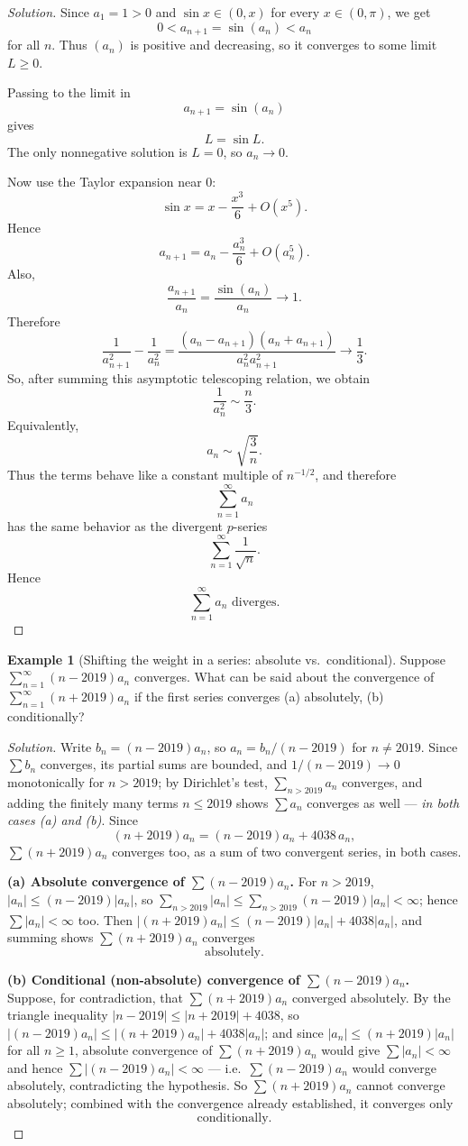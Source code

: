 \documentclass[11pt]{article}
\theoremstyle{definition}
\newtheorem{example}{Example}[section]
\begin{document}
\begin{proof}[Solution]
Since $a_1=1>0$ and $\sin x\in (0,x)$ for every $x\in(0,\pi)$, we get
\[
0<a_{n+1}=\sin(a_n)<a_n
\]
for all $n$. Thus $(a_n)$ is positive and decreasing, so it converges to some limit $L\ge 0$.

Passing to the limit in
\[
a_{n+1}=\sin(a_n)
\]
gives
\[
L=\sin L.
\]
The only nonnegative solution is $L=0$, so $a_n\to 0$.

Now use the Taylor expansion near $0$:
\[
\sin x = x-\frac{x^3}{6}+O(x^5).
\]
Hence
\[
a_{n+1}=a_n-\frac{a_n^3}{6}+O(a_n^5).
\]
Also,
\[
\frac{a_{n+1}}{a_n}=\frac{\sin(a_n)}{a_n}\to 1.
\]
Therefore
\[
\frac{1}{a_{n+1}^2}-\frac{1}{a_n^2}
=\frac{(a_n-a_{n+1})(a_n+a_{n+1})}{a_n^2 a_{n+1}^2}
\to \frac13.
\]
So, after summing this asymptotic telescoping relation, we obtain
\[
\frac{1}{a_n^2}\sim \frac{n}{3}.
\]
Equivalently,
\[
a_n\sim \sqrt{\frac{3}{n}}.
\]
Thus the terms behave like a constant multiple of $n^{-1/2}$, and therefore
\[
\sum_{n=1}^{\infty} a_n
\]
has the same behavior as the divergent $p$-series
\[
\sum_{n=1}^{\infty} \frac{1}{\sqrt{n}}.
\]
Hence
\[
\boxed{\sum_{n=1}^{\infty} a_n \text{ diverges}.}
\]
\end{proof}

\begin{example}[Shifting the weight in a series: absolute vs.\ conditional]
Suppose $\sum_{n=1}^\infty (n-2019)a_n$ converges. What can be said about the convergence of $\sum_{n=1}^\infty(n+2019)a_n$ if the first series converges (a) absolutely, (b) conditionally?
\end{example}

\begin{proof}[Solution]
Write $b_n=(n-2019)a_n$, so $a_n=b_n/(n-2019)$ for $n\neq2019$. Since $\sum b_n$ converges, its partial sums are bounded, and $1/(n-2019)\to0$ monotonically for $n>2019$; by Dirichlet's test, $\sum_{n>2019}a_n$ converges, and adding the finitely many terms $n\le2019$ shows $\sum a_n$ converges as well — \emph{in both cases (a) and (b)}. Since
\[
(n+2019)a_n = (n-2019)a_n + 4038\,a_n,
\]
$\sum(n+2019)a_n$ converges too, as a sum of two convergent series, in both cases.

\textbf{(a) Absolute convergence of $\sum(n-2019)a_n$.} For $n>2019$, $|a_n|\le(n-2019)|a_n|$, so $\sum_{n>2019}|a_n|\le\sum_{n>2019}(n-2019)|a_n|<\infty$; hence $\sum|a_n|<\infty$ too. Then $|(n+2019)a_n|\le(n-2019)|a_n|+4038|a_n|$, and summing shows $\sum(n+2019)a_n$ converges
\[
\boxed{\text{absolutely}}.
\]

\textbf{(b) Conditional (non-absolute) convergence of $\sum(n-2019)a_n$.} Suppose, for contradiction, that $\sum(n+2019)a_n$ converged absolutely. By the triangle inequality $|n-2019|\le|n+2019|+4038$, so $|(n-2019)a_n|\le|(n+2019)a_n|+4038|a_n|$; and since $|a_n|\le(n+2019)|a_n|$ for all $n\ge1$, absolute convergence of $\sum(n+2019)a_n$ would give $\sum|a_n|<\infty$ and hence $\sum|(n-2019)a_n|<\infty$ — i.e.\ $\sum(n-2019)a_n$ would converge absolutely, contradicting the hypothesis. So $\sum(n+2019)a_n$ cannot converge absolutely; combined with the convergence already established, it converges only
\[
\boxed{\text{conditionally}}.
\]
\end{proof}
\end{document}
